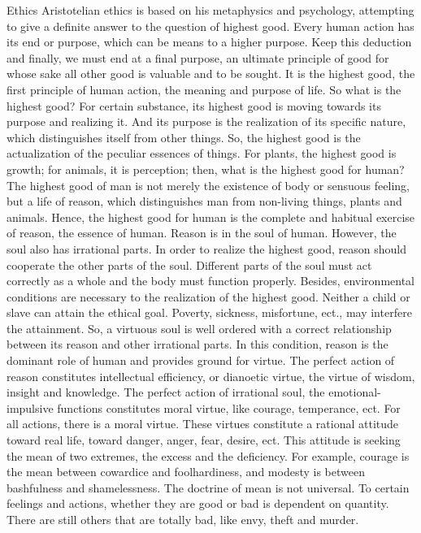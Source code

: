\documentclass[11pt]{article}
\begin{document}
Ethics
  Aristotelian ethics is based on his metaphysics and psychology, attempting to give a definite answer to the question of highest good. Every human action has its end or purpose, which can be means to a higher purpose. Keep this deduction and finally, we must end at a final purpose, an ultimate principle of good for whose sake all other good is valuable and to be sought. It is the highest good, the first principle of human action, the meaning and purpose of life.
  So what is the highest good? For certain substance, its highest good is moving towards its purpose and realizing it. And its purpose is the realization of its specific nature, which distinguishes itself from other things. So, the highest good is the actualization of the peculiar essences of things. For plants, the highest good is growth; for animals, it is perception; then, what is the highest good for human? The highest good of man is not merely the existence of body or sensuous feeling, but a life of reason, which distinguishes man from non-living things, plants and animals. Hence, the highest good for human is the complete and habitual exercise of reason, the essence of human.
  Reason is in the soul of human. However, the soul also has irrational parts. In order to realize the highest good, reason should cooperate the other parts of the soul. Different parts of the soul must act correctly as a whole and the body must function properly. Besides, environmental conditions are necessary to the realization of the highest good. Neither a child or slave can attain the ethical goal. Poverty, sickness, misfortune, ect., may interfere the attainment.
  So, a virtuous soul is well ordered with a correct relationship between its reason and other irrational parts. In this condition, reason is the dominant role of human and provides ground for virtue. The perfect action of reason constitutes intellectual efficiency, or dianoetic virtue, the virtue of wisdom, insight and knowledge. The perfect action of irrational soul, the emotional-impulsive functions constitutes moral virtue, like courage, temperance, ect. For all actions, there is a moral virtue. These virtues constitute a rational attitude toward real life, toward danger, anger, fear, desire, ect. This attitude is seeking the mean of two extremes, the excess and the deficiency. For example, courage is the mean between cowardice and foolhardiness, and modesty is between bashfulness and shamelessness. The doctrine of mean is not universal. To certain feelings and actions, whether they are good or bad is dependent on quantity. There are still others that are totally bad, like envy, theft and murder. 
\end{document}
